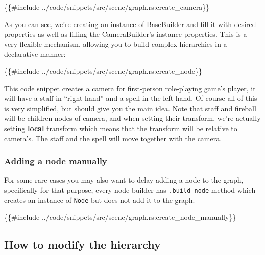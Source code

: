 \documentclass[
]{book}
\newenvironment{Shaded}{\begin{snugshade}}{\end{snugshade}}
\newcommand{\NormalTok}[1]{#1}
\theoremstyle{definition}
\theoremstyle{definition}
\theoremstyle{definition}
\theoremstyle{definition}
\theoremstyle{remark}
\begin{document}
\begin{Shaded}
\begin{Highlighting}[]
\NormalTok{\{\{\#include ../code/snippets/src/scene/graph.rs:create\_camera\}\}}
\end{Highlighting}
\end{Shaded}

As you can see, we're creating an instance of BaseBuilder and fill it with desired properties as well as filling the CameraBuilder's instance properties. This is a very flexible mechanism, allowing you to build complex hierarchies in a declarative manner:

\begin{Shaded}
\begin{Highlighting}[]
\NormalTok{\{\{\#include ../code/snippets/src/scene/graph.rs:create\_node\}\}}
\end{Highlighting}
\end{Shaded}

This code snippet creates a camera for first-person role-playing game's player, it will have a staff in ``right-hand'' and a spell in the left hand. Of course all of this is very simplified, but should give you the main idea. Note that staff and fireball will be children nodes of camera, and when setting their transform, we're actually setting \textbf{local} transform which means that the transform will be relative to camera's. The staff and the spell will move together with the camera.

\subsubsection{Adding a node manually}\label{adding-a-node-manually}

For some rare cases you may also want to delay adding a node to the graph, specifically for that purpose, every node builder has \texttt{.build\_node} method which creates an instance of \texttt{Node} but does not add it to the graph.

\begin{Shaded}
\begin{Highlighting}[]
\NormalTok{\{\{\#include ../code/snippets/src/scene/graph.rs:create\_node\_manually\}\}}
\end{Highlighting}
\end{Shaded}

\subsection{How to modify the hierarchy}\label{how-to-modify-the-hierarchy}
\end{document}
